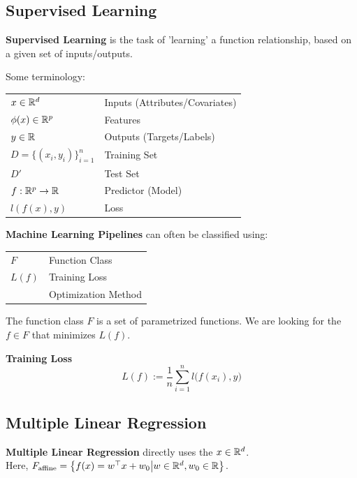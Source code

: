 \subsection{Supervised Learning}

\textbf{Supervised Learning} is the task of 'learning' a function relationship, based on a given set of inputs/outputs.

Some terminology:

\begin{tabular}{ll}
    $x \in \mathbb{R}^d$                    & Inputs (Attributes/Covariates)    \\
    $\phi(x) \in \mathbb{R}^p$              & Features                          \\
    $y \in \mathbb{R}$                      & Outputs (Targets/Labels)          \\
    $D = \{ (x_i,y_i) \}_{i=1}^n$   & Training Set                      \\
    $D'$                            & Test Set                          \\
    $f: \mathbb{R}^p \to \mathbb{R}$                & Predictor (Model)                 \\
    $l(f(x), y)$                    & Loss                  
\end{tabular}

\textbf{Machine Learning Pipelines} can often be classified using:

\begin{tabular}{ll}
    $F$                             & Function Class                    \\
    $L(f)$                          & Training Loss                     \\
                                    & Optimization Method
\end{tabular}

{\small
    The function class $F$ is a set of parametrized functions. 
    We are looking for the $f \in F$ that minimizes $L(f)$.
}

 \textbf{Training Loss}
$$
    L(f) := \frac{1}{n}\sum_{i=1}^{n} l\bigl( f(x_i), y \bigr) 
$$

\newpage

\subsection{Multiple Linear Regression}

\textbf{Multiple Linear Regression} directly uses the $x \in \mathbb{R}^d$. \\
Here, $F_\text{affine} = \bigl\{ f(x) = w^\top x + w_0 \big| w \in \mathbb{R}^d, w_0 \in \mathbb{R} \bigr\}$. 

